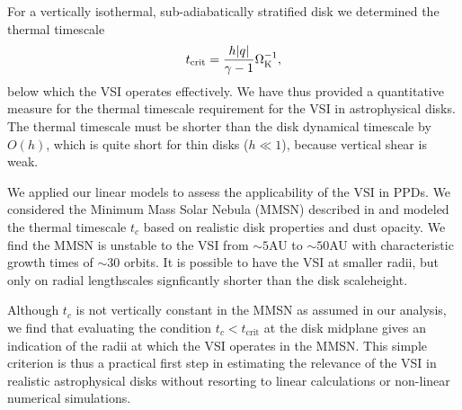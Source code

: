 For a vertically isothermal, sub-adiabatically stratified disk we
determined the thermal timescale   
\begin{align*}
  t_\mathrm{crit} = \frac{ h |q|}{\gamma-1}\Omega_{\rm K}^{-1}, 
\end{align*}
below which the VSI operates effectively. 
We have thus provided a quantitative measure for the thermal
timescale requirement for the VSI in astrophysical 
disks. The thermal timescale must be shorter than the disk
dynamical timescale by $O( h)$, which is 
quite short for thin disks ($ h\ll 1$), because vertical shear is weak.    

We applied our linear models to assess the applicability of the VSI in
PPDs. We considered the Minimum Mass Solar Nebula 
(MMSN) described in \cite{chiang10} and   
modeled the thermal timescale $t_c$ based on realistic
disk properties and dust opacity. 
We find the MMSN is unstable to the VSI 
from $\sim 5$AU to $\sim50$AU with characteristic growth times of
$\sim 30$ orbits. It is possible to have the VSI at smaller
radii, but only on radial lengthscales signficantly shorter
than the disk scaleheight. %

Although $t_c$ is not vertically constant in the 
MMSN as assumed in our analysis, we find that evaluating the condition
$t_c< t_\mathrm{crit}$ at the disk midplane gives an indication of the
radii at which the VSI operates in the MMSN. This simple criterion is
thus a practical first step in estimating the relevance of the VSI in
realistic astrophysical disks without resorting to linear
calculations or non-linear numerical simulations.   

 




